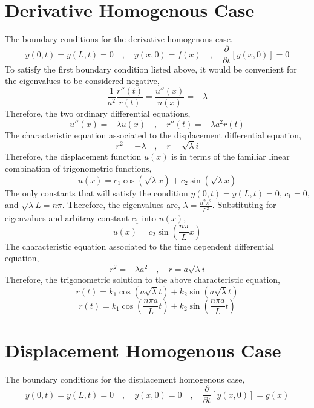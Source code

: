\section{Derivative Homogenous Case}
\begin{comment}
\end{comment}
The boundary conditions for the derivative homogenous case,
$$y(0,t) = y(L,t) = 0\quad,\quad y(x,0) = f(x)\quad,\quad\frac{\partial }{\partial t}[y(x,0)] = 0$$
To satisfy the first boundary condition listed above, it would be convenient for the eigenvalues to be considered negative,
$$\frac{1}{a^2}\frac{r''(t)}{r(t)} = \frac{u''(x)}{u(x)} = -\lambda$$
Therefore, the two ordinary differential equations,
$$u''(x) = -\lambda u(x)\quad,\quad r''(t) = -\lambda a^2 r(t)$$
The characteristic equation associated to the displacement differential equation,
$$r^2 = -\lambda \quad,\quad r = \sqrt{\lambda}i$$
Therefore, the displacement function $u(x)$ is in terms of the familiar linear combination of trigonometric functions,
$$u(x) = c_1\cos\left(\sqrt{\lambda}x\right) + c_2\sin\left(\sqrt{\lambda}x\right)$$
The only constants that will satisfy the condition $\displaystyle{y(0,t) = y(L,t) = 0}$, $c_1 = 0$, and $\sqrt{\lambda}L = n\pi$. Therefore, the eigenvalues are, $\displaystyle{\lambda = \frac{n^2\pi^2}{L^2}}$. Substituting for eigenvalues and arbitray constant $c_1$ into $u(x)$,
$$u(x) = c_2\sin\left(\frac{n\pi}{L}x\right)$$
The characteristic equation associated to the time dependent differential equation,
$$r^2 = -\lambda a^2\quad,\quad r = a\sqrt{\lambda}i$$
Therefore, the trigonometric solution to the above characteristic equation,
$$r(t) = k_1\cos\left(a\sqrt{\lambda}t\right) + k_2\sin\left(a\sqrt{\lambda}t\right)$$
$$r(t) = k_1\cos\left(\frac{n\pi a}{L}t\right) + k_2\sin\left(\frac{n\pi a}{L}t\right)$$
\section{Displacement Homogenous Case}
\begin{comment}
\end{comment}
The boundary conditions for the displacement homogenous case,
$$y(0,t) = y(L,t) = 0\quad,\quad y(x,0) = 0\quad,\quad\frac{\partial }{\partial t}[y(x,0)] = g(x)$$

